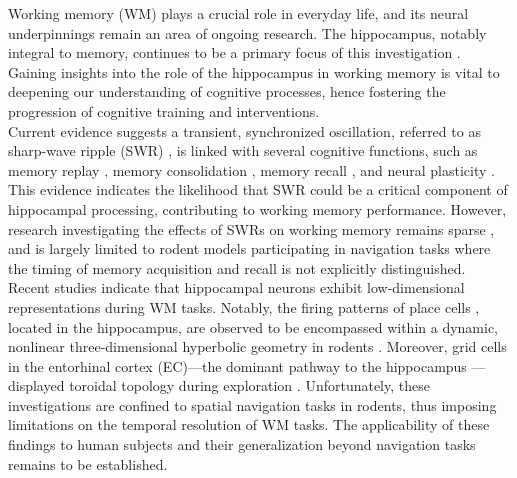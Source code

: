 \documentclass[final,3p,times,twocolumn]{elsarticle}
\begin{document}
Working memory (WM) plays a crucial role in everyday life, and its neural underpinnings remain an area of ongoing research. The hippocampus, notably integral to memory, continues to be a primary focus of this investigation \cite{scoville_loss_1957} \cite{squire_legacy_2009}  \cite{boran_persistent_2019} \cite{kaminski_persistently_2017} \cite{kornblith_persistent_2017} \cite{faraut_dataset_2018} \cite{borders_hippocampus_2022} \cite{li_functional_2023} \cite{dimakopoulos_information_2022}. Gaining insights into the role of the hippocampus in working memory is vital to deepening our understanding of cognitive processes, hence fostering the progression of cognitive training and interventions.
\\
\indent
Current evidence suggests a transient, synchronized oscillation, referred to as sharp-wave ripple (SWR) \cite{buzsaki_hippocampal_2015}, is linked with several cognitive functions, such as memory replay \cite{wilson_reactivation_1994} \cite{nadasdy_replay_1999} \cite{lee_memory_2002} \cite{diba_forward_2007} \cite{davidson_hippocampal_2009}, memory consolidation \cite{girardeau_selective_2009} \cite{ego-stengel_disruption_2010} \cite{fernandez-ruiz_long-duration_2019} \cite{kim_corticalhippocampal_2022}, memory recall \cite{wu_hippocampal_2017} \cite{norman_hippocampal_2019} \cite{norman_hippocampal_2021}, and neural plasticity \cite{behrens_induction_2005} \cite{norimoto_hippocampal_2018}. This evidence indicates the likelihood that SWR could be a critical component of hippocampal processing, contributing to working memory performance. However, research investigating the effects of SWRs on working memory remains sparse \cite{jadhav_awake_2012}, and is largely limited to rodent models participating in navigation tasks where the timing of memory acquisition and recall is not explicitly distinguished.
\\
\indent
Recent studies indicate that hippocampal neurons exhibit low-dimensional representations during WM tasks. Notably, the firing patterns of place cells \cite{okeefe_hippocampus_1971} \cite{okeefe_place_1976} \cite{ekstrom_cellular_2003} \cite{kjelstrup_finite_2008} \cite{harvey_intracellular_2009}, located in the hippocampus, are observed to be encompassed within a dynamic, nonlinear three-dimensional hyperbolic geometry in rodents \cite{zhang_hippocampal_2022}. Moreover, grid cells in the entorhinal cortex (EC)—the dominant pathway to the hippocampus \cite{naber_reciprocal_2001} \cite{van_strien_anatomy_2009} \cite{strange_functional_2014}—displayed toroidal topology during exploration \cite{gardner_toroidal_2022}. Unfortunately, these investigations are confined to spatial navigation tasks in rodents, thus imposing limitations on the temporal resolution of WM tasks. The applicability of these findings to human subjects and their generalization beyond navigation tasks remains to be established.
\end{document}
